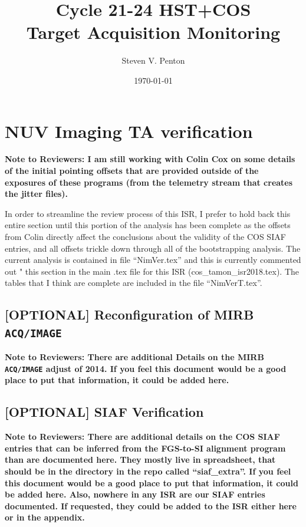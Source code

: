 \documentclass{stsci_report}
\title{\textbf{Cycle 21-24 HST+COS\\Target Acquisition Monitoring}}
\author{Steven V. Penton}
\date{\today}
\newcommand{\tacq}[1]{\texttt{ACQ/#1}}
\begin{document}
\maketitle


\clearpage
\tableofcontents
\listoffigures
\listoftables
\newpage
%

\clearpage



\clearpage





\clearpage



\clearpage
\section{NUV Imaging TA verification}\label{sec:NimVER}
{\bf Note to Reviewers: I am still working with Colin Cox on some details of the
initial pointing offsets that are provided outside of the exposures of these programs (from the telemetry stream that creates the jitter files).

In order to streamline the review process of this ISR, I prefer
to hold back this entire section until this portion of the
analysis has been complete as the offsets from Colin directly
affect the conclusions about the validity of the COS SIAF entries, and all offsets trickle down through all of the bootstrapping
analysis. The current analysis is contained in file ``NimVer.tex''
and this is currently commented out "%
this section in the main .tex file for this ISR (cos\_tamon\_isr2018.tex).
The tables that I think are complete are included in the file ``NimVerT.tex''.}
%


\subsection{[OPTIONAL] Reconfiguration of MIRB \tacq{IMAGE}} \label{subsec:newMIRB}
{\bf Note to Reviewers: There are additional Details on the MIRB \tacq{IMAGE} adjust of 2014.
If you feel this document would be a good place to put that information, it could be added here.}\\

\subsection{[OPTIONAL] SIAF Verification} \label{sec:siaf}\label{subsec:siafextra}
{\bf Note to Reviewers: There are additional details on the COS SIAF entries that can be inferred from the FGS-to-SI alignment program than are documented here. They mostly live in spreadsheet, that
should be in the directory in the repo called ``siaf\_extra''. If you feel this document would be a good place to put that information, it could be added here.
Also, nowhere in any ISR are our SIAF entries documented. If requested, they could be added to the ISR either here or in the appendix.}

\end{document}
